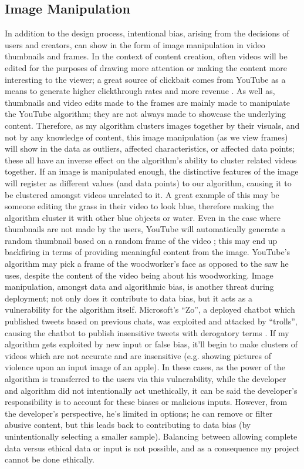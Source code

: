 \documentclass[10pt,twocolumn]{article}
\begin{document}
\subsection {Image Manipulation}

In addition to the design process, intentional bias, arising from the decisions of users and creators, can show in the form of image manipulation in video thumbnails and frames.	
In the context of content creation, often videos will be edited for the purposes of drawing more attention or making the content more interesting to the viewer; a great source of clickbait comes from YouTube as a means to generate higher clickthrough rates and more revenue \cite{Muller2021}. As well as, thumbnails and video edits made to the frames are mainly made to manipulate the YouTube algorithm; they are not always made to showcase the underlying content. Therefore, as my algorithm clusters images together by their visuals, and not by any knowledge of content, this image manipulation (as we view frames) will show in the data as outliers, affected characteristics, or affected data points; these all have an inverse effect on the algorithm’s ability to cluster related videos together. If an image is manipulated enough, the distinctive features of the image will register as different values (and data points) to our algorithm, causing it to be clustered amongst videos unrelated to it. A great example of this may be someone editing the grass in their video to look blue, therefore making the algorithm cluster it with other blue objects or water. Even in the case where thumbnails are not made by the users, YouTube will automatically generate a random thumbnail based on a random frame of the video \cite{YTAddingThumbnails}; this may end up backfiring in terms of providing meaningful content from the image. YouTube’s algorithm may pick a frame of the woodworker’s face as opposed to the saw he uses, despite the content of the video being about his woodworking. Image manipulation, amongst data and algorithmic bias, is another threat during deployment; not only does it contribute to data bias, but it acts as a vulnerability for the algorithm itself. Microsoft’s “Zo”, a deployed chatbot which published tweets based on previous chats, was exploited and attacked by “trolls”, causing the chatbot to publish insensitive tweets with derogatory terms \cite{CrashCourseABias}. If my algorithm gets exploited by new input or false bias, it’ll begin to make clusters of videos which are not accurate and are insensitive (e.g. showing pictures of violence upon an input image of an apple). In these cases, as the power of the algorithm is transferred to the users via this vulnerability, while the developer and algorithm did not intentionally act unethically, it can be said the developer’s responsibility is to account for these biases or malicious inputs. However, from the developer’s perspective, he’s limited in options; he can remove or filter abusive content, but this leads back to contributing to data bias (by unintentionally selecting a smaller sample). Balancing between allowing complete data versus ethical data or input is not possible, and as a consequence my project cannot be done ethically.
\end{document}
